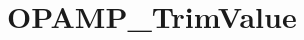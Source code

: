 \hypertarget{group___o_p_a_m_p___trim_value}{\section{O\-P\-A\-M\-P\-\_\-\-Trim\-Value}
\label{group___o_p_a_m_p___trim_value}
}
